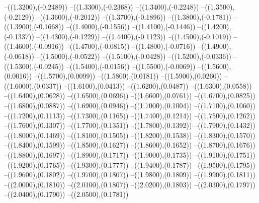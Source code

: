 {	--({\sx*(1.3200)},{\sy*(-0.2489)})
	--({\sx*(1.3300)},{\sy*(-0.2368)})
	--({\sx*(1.3400)},{\sy*(-0.2248)})
	--({\sx*(1.3500)},{\sy*(-0.2129)})
	--({\sx*(1.3600)},{\sy*(-0.2012)})
	--({\sx*(1.3700)},{\sy*(-0.1896)})
	--({\sx*(1.3800)},{\sy*(-0.1781)})
	--({\sx*(1.3900)},{\sy*(-0.1668)})
	--({\sx*(1.4000)},{\sy*(-0.1556)})
	--({\sx*(1.4100)},{\sy*(-0.1446)})
	--({\sx*(1.4200)},{\sy*(-0.1337)})
	--({\sx*(1.4300)},{\sy*(-0.1229)})
	--({\sx*(1.4400)},{\sy*(-0.1123)})
	--({\sx*(1.4500)},{\sy*(-0.1019)})
	--({\sx*(1.4600)},{\sy*(-0.0916)})
	--({\sx*(1.4700)},{\sy*(-0.0815)})
	--({\sx*(1.4800)},{\sy*(-0.0716)})
	--({\sx*(1.4900)},{\sy*(-0.0618)})
	--({\sx*(1.5000)},{\sy*(-0.0522)})
	--({\sx*(1.5100)},{\sy*(-0.0428)})
	--({\sx*(1.5200)},{\sy*(-0.0336)})
	--({\sx*(1.5300)},{\sy*(-0.0245)})
	--({\sx*(1.5400)},{\sy*(-0.0156)})
	--({\sx*(1.5500)},{\sy*(-0.0069)})
	--({\sx*(1.5600)},{\sy*(0.0016)})
	--({\sx*(1.5700)},{\sy*(0.0099)})
	--({\sx*(1.5800)},{\sy*(0.0181)})
	--({\sx*(1.5900)},{\sy*(0.0260)})
	--({\sx*(1.6000)},{\sy*(0.0337)})
	--({\sx*(1.6100)},{\sy*(0.0413)})
	--({\sx*(1.6200)},{\sy*(0.0487)})
	--({\sx*(1.6300)},{\sy*(0.0558)})
	--({\sx*(1.6400)},{\sy*(0.0628)})
	--({\sx*(1.6500)},{\sy*(0.0696)})
	--({\sx*(1.6600)},{\sy*(0.0761)})
	--({\sx*(1.6700)},{\sy*(0.0825)})
	--({\sx*(1.6800)},{\sy*(0.0887)})
	--({\sx*(1.6900)},{\sy*(0.0946)})
	--({\sx*(1.7000)},{\sy*(0.1004)})
	--({\sx*(1.7100)},{\sy*(0.1060)})
	--({\sx*(1.7200)},{\sy*(0.1113)})
	--({\sx*(1.7300)},{\sy*(0.1165)})
	--({\sx*(1.7400)},{\sy*(0.1214)})
	--({\sx*(1.7500)},{\sy*(0.1262)})
	--({\sx*(1.7600)},{\sy*(0.1307)})
	--({\sx*(1.7700)},{\sy*(0.1351)})
	--({\sx*(1.7800)},{\sy*(0.1392)})
	--({\sx*(1.7900)},{\sy*(0.1432)})
	--({\sx*(1.8000)},{\sy*(0.1469)})
	--({\sx*(1.8100)},{\sy*(0.1505)})
	--({\sx*(1.8200)},{\sy*(0.1538)})
	--({\sx*(1.8300)},{\sy*(0.1570)})
	--({\sx*(1.8400)},{\sy*(0.1599)})
	--({\sx*(1.8500)},{\sy*(0.1627)})
	--({\sx*(1.8600)},{\sy*(0.1652)})
	--({\sx*(1.8700)},{\sy*(0.1676)})
	--({\sx*(1.8800)},{\sy*(0.1697)})
	--({\sx*(1.8900)},{\sy*(0.1717)})
	--({\sx*(1.9000)},{\sy*(0.1735)})
	--({\sx*(1.9100)},{\sy*(0.1751)})
	--({\sx*(1.9200)},{\sy*(0.1765)})
	--({\sx*(1.9300)},{\sy*(0.1777)})
	--({\sx*(1.9400)},{\sy*(0.1787)})
	--({\sx*(1.9500)},{\sy*(0.1795)})
	--({\sx*(1.9600)},{\sy*(0.1802)})
	--({\sx*(1.9700)},{\sy*(0.1807)})
	--({\sx*(1.9800)},{\sy*(0.1809)})
	--({\sx*(1.9900)},{\sy*(0.1811)})
	--({\sx*(2.0000)},{\sy*(0.1810)})
	--({\sx*(2.0100)},{\sy*(0.1807)})
	--({\sx*(2.0200)},{\sy*(0.1803)})
	--({\sx*(2.0300)},{\sy*(0.1797)})
	--({\sx*(2.0400)},{\sy*(0.1790)})
	--({\sx*(2.0500)},{\sy*(0.1781)})
}
